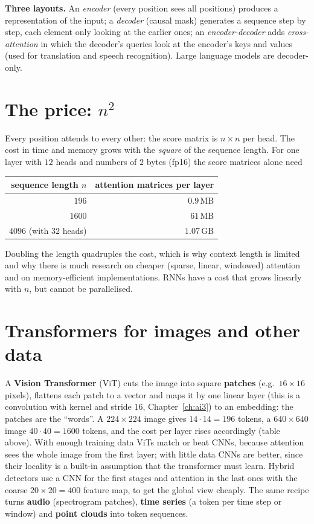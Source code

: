 \textbf{Three layouts.} An \emph{encoder} (every position sees all positions) produces a representation of the input; a \emph{decoder} (causal mask) generates a sequence step by step, each element only looking at the earlier ones; an \emph{encoder-decoder} adds \emph{cross-attention} in which the decoder's queries look at the encoder's keys and values (used for translation and speech recognition). Large language models are decoder-only.

\section*{The price: $n^2$}
Every position attends to every other: the score matrix is $n\times n$ per head. The cost in time and memory grows with the \emph{square} of the sequence length. For one layer with $12$ heads and numbers of $2$ bytes (fp16) the score matrices alone need
\begin{center}
\renewcommand{\arraystretch}{1.2}
\begin{tabular}{rr}
\textbf{sequence length $n$} & \textbf{attention matrices per layer}\\ \hline
$196$ & $0.9$\,MB\\
$1600$ & $61$\,MB\\
$4096$ (with $32$ heads) & $1.07$\,GB\\
\end{tabular}
\end{center}
Doubling the length quadruples the cost, which is why context length is limited and why there is much research on cheaper (sparse, linear, windowed) attention and on memory-efficient implementations. RNNs have a cost that grows linearly with $n$, but cannot be parallelised.

\section*{Transformers for images and other data}
A \textbf{Vision Transformer} (ViT) cuts the image into square \textbf{patches} (e.g.\ $16\times16$ pixels), flattens each patch to a vector and maps it by one linear layer (this is a convolution with kernel and stride $16$, Chapter~\ref{ch:ai3}) to an embedding: the patches are the ``words''. A $224\times224$ image gives $14\cdot14=196$ tokens, a $640\times640$ image $40\cdot40=1600$ tokens, and the cost per layer rises accordingly (table above). With enough training data ViTs match or beat CNNs, because attention sees the whole image from the first layer; with little data CNNs are better, since their locality is a built-in assumption that the transformer must learn. Hybrid detectors use a CNN for the first stages and attention in the last ones with the coarse $20\times20=400$ feature map, to get the global view cheaply. The same recipe turns \textbf{audio} (spectrogram patches), \textbf{time series} (a token per time step or window) and \textbf{point clouds} into token sequences.
